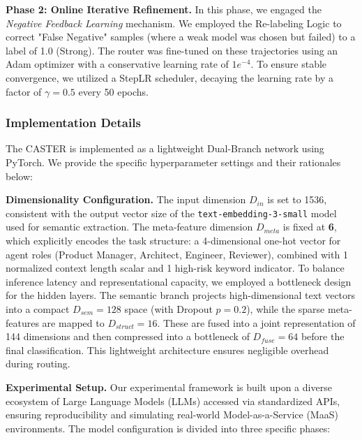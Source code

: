 \documentclass{article}
\theoremstyle{plain}
\theoremstyle{definition}
\theoremstyle{remark}
\begin{document}
\textbf{Phase 2: Online Iterative Refinement.} 
    In this phase, we engaged the \textit{Negative Feedback Learning} mechanism. We employed the Re-labeling Logic to correct "False Negative" samples (where a weak model was chosen but failed) to a label of 1.0 (Strong). The router was fine-tuned on these trajectories using an Adam optimizer with a conservative learning rate of \textbf{$1e^{-4}$}. To ensure stable convergence, we utilized a StepLR scheduler, decaying the learning rate by a factor of $\gamma=0.5$ every 50 epochs.

\subsubsection{Implementation Details}

The CASTER is implemented as a lightweight Dual-Branch network using PyTorch. We provide the specific hyperparameter settings and their rationales below:

\textbf{Dimensionality Configuration.}
The input dimension $D_{in}$ is set to 1536, consistent with the output vector size of the \texttt{text-embedding-3-small} model used for semantic extraction. The meta-feature dimension $D_{meta}$ is fixed at \textbf{6}, which explicitly encodes the task structure: a 4-dimensional one-hot vector for agent roles (Product Manager, Architect, Engineer, Reviewer), combined with 1 normalized context length scalar and 1 high-risk keyword indicator.
To balance inference latency and representational capacity, we employed a bottleneck design for the hidden layers. The semantic branch projects high-dimensional text vectors into a compact $D_{sem}=128$ space (with Dropout $p=0.2$), while the sparse meta-features are mapped to $D_{struct}=16$. These are fused into a joint representation of 144 dimensions and then compressed into a bottleneck of $D_{fuse}=64$ before the final classification. This lightweight architecture ensures negligible overhead during routing.

\textbf{Experimental Setup.} 
Our experimental framework is built upon a diverse ecosystem of Large Language Models (LLMs) accessed via standardized APIs, ensuring reproducibility and simulating real-world Model-as-a-Service (MaaS) environments. The model configuration is divided into three specific phases:
\end{document}
